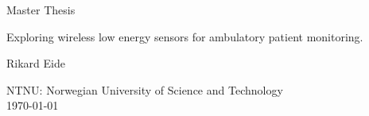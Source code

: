 \begin{titlepage}
    \begin{center}
        \vspace*{1cm}
        
        \huge{Master Thesis}
        
        \vspace{1cm}
        \normalsize
        Exploring wireless low energy sensors for ambulatory patient monitoring.
        
        \vspace{1.5cm}
        
        \normalsize
        {Rikard Eide}
        
        \vfill
        
        
        \vspace{0.8cm}
        
        NTNU: Norwegian University of Science and Technology\\
        \today
        
    \end{center}
\end{titlepage}
